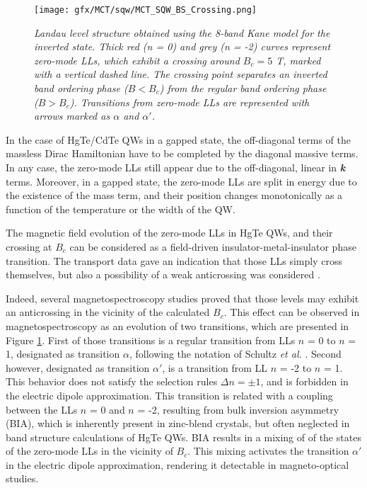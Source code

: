 \documentclass[titlepage,a4paper]{book}
\begin{document}
\begin{figure}[H]
	\centering
	\texttt{[image: gfx/MCT/sqw/MCT\_SQW\_BS\_Crossing.png]}
	\vspace{-10pt}
	\caption{\textit{Landau level structure obtained using the 8-band Kane model for the inverted state. Thick red (n = 0) and grey (n = -2) curves represent zero-mode LLs, which exhibit a crossing around $B_c = 5$ T, marked with a vertical dashed line. The crossing point separates an inverted band ordering phase ($B < B_c$) from the regular band ordering phase ($B > B_c$). Transitions from zero-mode LLs are represented with arrows marked as $\alpha$ and $\alpha'$.}}
	\label{fig:MCT_SQW_BS_Crossing}
\end{figure} 

In the case of HgTe/CdTe QWs in a gapped state, the off-diagonal terms of the massless Dirac Hamiltonian have to be completed by the diagonal massive terms. In any case, the zero-mode LLs still appear due to the off-diagonal, linear in \textbf{\textit{k}} terms. Moreover, in a gapped state, the zero-mode LLs are split in energy due to the existence of the mass term, and their position changes monotonically as a function of the temperature or the width of the QW.

The magnetic field evolution of the zero-mode LLs in HgTe QWs, and their crossing at $B_c$ can be considered as a field-driven insulator-metal-insulator phase transition. The transport data \cite{Konig_Topology} gave an indication that those LLs simply cross themselves, but also a possibility of a weak anticrossing was considered \cite{Konig_MCT_SQW}.

Indeed, several magnetospectroscopy studies \cite{Orlita_MCT_QW}\cite{Zholudev_MCT_QW} proved that those levels may exhibit an anticrossing in the vicinity of the calculated $B_c$. This effect can be observed in magnetospectroscopy as an evolution of two transitions, which are presented in Figure \ref{fig:MCT_SQW_BS_Crossing}. First of those transitions is a regular transition from LLs $n$ = 0 to $n$ = 1, designated as transition $\alpha$, following the notation of Schultz \textit{et al.} \cite{Schultz}. Second however, designated as transition $\alpha'$, is a transition from LL $n$ = -2 to $n$ = 1. This behavior does not satisfy the selection rules $\Delta n = \pm 1$, and is forbidden in the electric dipole approximation. This transition is related with a coupling between the LLs $n$ = 0 and $n$ = -2, resulting from bulk inversion asymmetry (BIA), which is inherently present in zinc-blend crystals, but often neglected in band structure calculations of HgTe QWs. BIA results in a mixing of of the states of the zero-mode LLs in the vicinity of $B_c$. This mixing activates the transition $\alpha'$ in the electric dipole approximation, rendering it detectable in magneto-optical studies.
\end{document}

